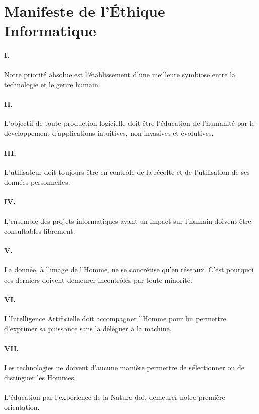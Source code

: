 \newpage
\section*{Manifeste de l'Éthique Informatique}
\paragraph{}

\paragraph{I.} Notre priorité absolue est l'établissement d'une meilleure symbiose entre la technologie et le genre humain.

\paragraph{II.} L'objectif de toute production logicielle doit être l'éducation de l'humanité par le développement d'applications
intuitives, non-invasives et évolutives.

\paragraph{III.} L'utilisateur doit toujours être en contrôle de la récolte et de l'utilisation de ses données personnelles.

\paragraph{IV.} L'ensemble des projets informatiques ayant un impact sur l'humain doivent être consultables librement.

\paragraph{V.} La donnée, à l'image de l'Homme, ne se concrétise qu'en réseaux. C'est pourquoi ces derniers doivent demeurer
incontrôlés par toute minorité.

\paragraph{VI.} L'Intelligence Artificielle doit accompagner l'Homme pour lui permettre d'exprimer sa puissance sans la 
déléguer à la machine.

\paragraph{VII.} Les technologies ne doivent d'aucune manière permettre de sélectionner ou de distinguer les Hommes.

\paragraph{}

\paragraph{} \centerline{L'éducation par l'expérience de la Nature doit demeurer notre première orientation.}
